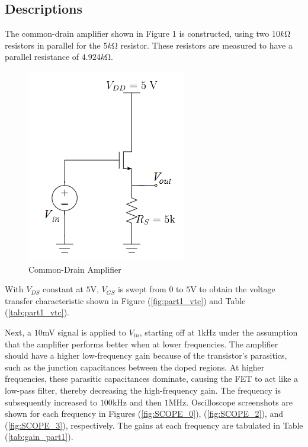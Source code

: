 \subsection{Descriptions}
The common-drain amplifier shown in Figure 1 is constructed, using two $10k$\si{\ohm} resistors in parallel for the $5k$\si{\ohm} resistor.
These resistors are measured to have a parallel resistance of $4.924k$\si{\ohm}.

\FloatBarrier

\begin{figure}[h!]
	\centering
	\includegraphics[scale=0.45]{./images/circuit_1.PNG}
	\caption{Common-Drain Amplifier}
	\label{fig:circuit_1}
\end{figure}

\FloatBarrier

With $V_{DS}$ constant at $5$\si{\volt}, $V_{GS}$ is swept from 0 to $5$\si{\volt} to obtain the voltage transfer characteristic shown in Figure (\ref{fig:part1_vtc}) and Table (\ref{tab:part1_vtc}).

Next, a $10$\si{\milli\volt} signal is applied to $V_{in}$, starting off at $1$\si{\kilo\hertz} under the assumption that the amplifier performs better when at lower frequencies. The amplifier should have a higher low-frequency gain because of the transistor's parasitics, such as the junction capacitances between the doped regions. At higher frequencies, these parasitic capacitances dominate, causing the FET to act like a low-pass filter, thereby decreasing the high-frequency gain.
The frequency is subsequently increased to $100$\si{\kilo\hertz} and then $1$\si{\mega\hertz}. Oscilloscope screenshots are shown for each frequency in Figures (\ref{fig:SCOPE_0}), (\ref{fig:SCOPE_2}), and (\ref{fig:SCOPE_3}), respectively.
The gains at each frequency are tabulated in Table (\ref{tab:gain_part1}).

